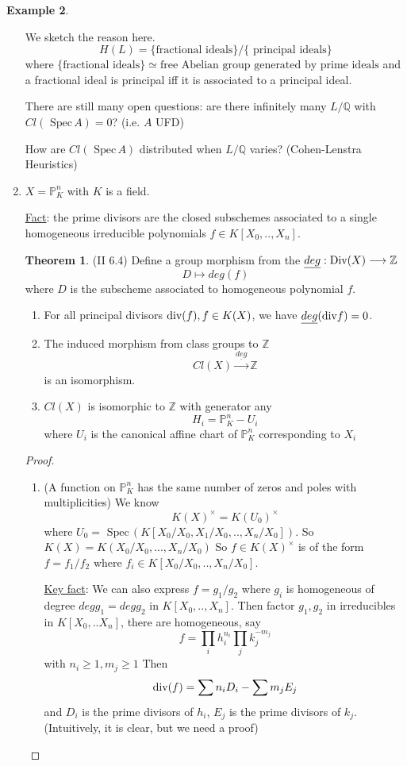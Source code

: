 \documentclass[11pt]{article}
\theoremstyle{definition}
\newtheorem{thm}{Theorem}[section]
\newtheorem{ex}[thm]{Example}
\newcommand{\spec}{\text{ Spec}\,}
\newcommand{\proj}{\mathbb P}
\newcommand{\intg}{\mathbb Z}
\newcommand{\ratl}{\mathbb Q}
\renewcommand{\div}{\textnormal{div}}
\newcommand{\Div}{\textnormal{Div}}
\newcommand{\lrta}{\longrightarrow}
\begin{document}
\begin{ex}
\begin{enumerate}[label=(\arabic*)]
We sketch the reason here.
$$
H(L)=\{\text{fractional ideals}\}/\{\text{ principal ideals}\}
$$
where $\{\text{fractional ideals}\}\simeq\text{free Abelian group generated by prime ideals}$ and  a fractional ideal is principal iff it is associated to a principal ideal.

There are still many open questions: are there infinitely many $L/\ratl$ with $Cl(\spec A)=0$? (i.e. $A$ UFD)

How are $Cl(\spec A)$ distributed when $L/\ratl$ varies? (Cohen-Lenstra Heuristics)

\item $X=\proj^n_K$ with $K$ is a field.

\underline{Fact}: the prime divisors are the closed subschemes associated to a single homogeneous irreducible polynomials $f\in  K[X_0,..,X_n]$.
\begin{thm}
(II 6.4) Define a group morphism from the $\underline{deg}: \Div(X)\lrta \intg$
$$
D\longmapsto deg(f)
$$ 
where $D$ is the subscheme associated to homogeneous polynomial $f$.
\begin{enumerate}[label=(\alph*)]
\item For all principal divisors $\div(f), f\in K(X)$, we have $\underline{deg}(\div f)=0$.
\item The induced morphism from class groups to $\intg$ 
$$
Cl(X)\overset{\underline{deg}}{\lrta }\intg
$$
is  an isomorphism.
\item $Cl(X)$ is isomorphic to $\intg$ with generator any 
$$
H_i=\proj^n_K-U_i
$$
where $U_i$ is  the canonical affine chart of $\proj^n_K$ corresponding to $X_i$
\end{enumerate}
\end{thm}
\begin{proof}
\begin{enumerate}[label=(\alph*)]
\item (A function on $\proj^n_K$ has the same number of zeros and poles with multiplicities) We know
$$
K(X)^\times=K(U_0)^\times
$$
where $U_0=\spec(K[X_0/X_0,X_1/X_0,..,X_n/X_0])$. So $K(X)=K(X_0/X_0,...,X_n/X_0)$
So $f\in K(X)^\times$ is of the form $f=f_1/f_2$ where $f_i \in K[X_0/X_0,..,X_n/X_0]$. 

\underline{Key fact}: 
We can also express $f=g_1/g_2$ where $g_i$ is homogeneous of degree $deg g_1=deg g_2$ in $K[X_0,..,X_n]$. Then factor $g_1,g_2$ in irreducibles in $K[X_0,..X_n]$, there are homogeneous, say 
$$
f=\prod_i h_i^{n_i}\prod_j k_j^{-m_j}
$$
with $n_i\geq 1, m_j \geq 1$
Then 
$$
\div(f)=\sum n_i D_i-\sum m_j E_j
$$
and $D_i$ is the prime divisors of $h_i$, $E_j$ is the prime divisors of $k_j$. (Intuitively, it is clear, but we need a proof)


\end{enumerate}
\end{proof}
\end{enumerate}
\end{ex}
\end{document}

